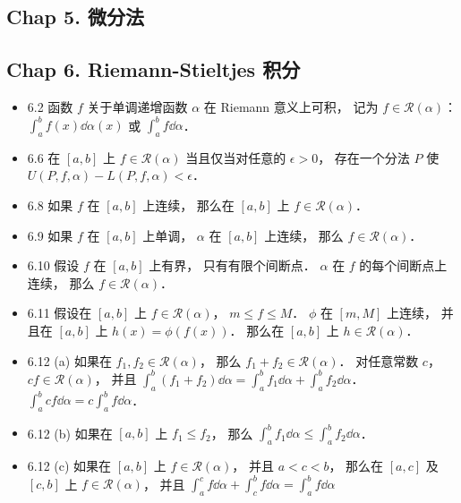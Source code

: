 \subsection{Chap 5. 微分法}

\subsection{Chap 6. Riemann-Stieltjes 积分}
\begin{itemize}
\item 6.2 函数 $f$ 关于单调递增函数 $\alpha$ 在 Riemann 意义上可积， 记为 $f\in \mathcal{R}(\alpha)$： $\int_a^b f(x) \dd\alpha(x)$ 或 $\int_a^b f\dd{\alpha}$．

\item 6.6 在 $[a,b]$ 上 $f\in\mathcal{R}(\alpha)$ 当且仅当对任意的 $\epsilon>0$， 存在一个分法 $P$ 使 $U(P,f,\alpha)-L(P,f,\alpha)<\epsilon$．

\item 6.8 如果 $f$ 在 $[a,b]$ 上连续， 那么在 $[a,b]$ 上 $f\in \mathcal{R}(\alpha)$．

\item 6.9 如果 $f$ 在 $[a,b]$ 上单调， $\alpha$ 在 $[a,b]$ 上连续， 那么 $f\in \mathcal{R}(\alpha)$．

\item 6.10 假设 $f$ 在 $[a,b]$ 上有界， 只有有限个间断点． $\alpha$ 在 $f$ 的每个间断点上连续， 那么 $f\in \mathcal{R}(\alpha)$．

\item 6.11 假设在 $[a,b]$ 上 $f\in \mathcal{R}(\alpha)$， $m\leqslant f\leqslant M$． $\phi$ 在 $[m, M]$ 上连续， 并且在 $[a,b]$ 上 $h(x) = \phi(f(x))$． 那么在 $[a,b]$ 上 $h\in \mathcal{R}(\alpha)$．

\item 6.12 (a) 如果在 $f_1,f_2 \in \mathcal{R}(\alpha)$， 那么 $f_1+f_2 \in \mathcal{R}(\alpha)$． 对任意常数 $c$， $cf\in \mathcal{R}(\alpha)$， 并且 $\int_a^b (f_1+f_2)\dd{\alpha} = \int_a^bf_1\dd{\alpha} + \int_a^bf_2\dd{\alpha}$． $\int_a^b cf\dd{\alpha} = c\int_a^b f\dd{\alpha}$．

\item  6.12 (b) 如果在 $[a,b]$ 上 $f_1\leqslant f_2$， 那么 $\int_a^bf_1\dd{\alpha} \leqslant \int_a^bf_2\dd{\alpha}$．

\item  6.12 (c) 如果在 $[a,b]$ 上 $f\in \mathcal{R}(\alpha)$， 并且 $a<c< b$， 那么在 $[a,c]$ 及 $[c,b]$ 上 $f\in \mathcal{R}(\alpha)$， 并且 $\int_a^cf\dd{\alpha}+\int_c^bf\dd{\alpha} = \int_a^bf\dd{\alpha}$


\end{itemize}
